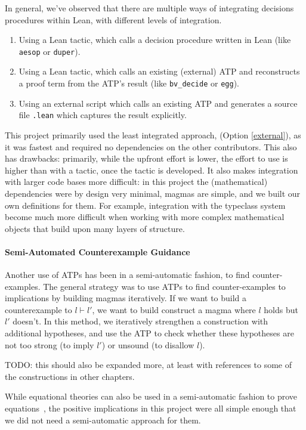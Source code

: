 In general, we've observed that there are multiple ways of integrating decisions procedures within Lean, with different levels of integration.
\begin{enumerate}
    \item Using a Lean tactic, which calls a decision procedure written in Lean (like \texttt{aesop} or \texttt{duper}).
    \item Using a Lean tactic, which calls an existing (external) ATP and reconstructs a proof term from the ATP's result (like \texttt{bv\_decide} or \texttt{egg}).
    \item\label{external} Using an external script which calls an existing ATP and generates a source file \texttt{.lean} which captures the result explicitly.
\end{enumerate}


This project primarily used the least integrated approach, (Option \ref{external}), as it was fastest and required no dependencies on the other contributors.
This also has drawbacks: primarily, while the upfront effort is lower, the effort to use is higher than with a tactic, once the tactic is developed.
It also makes integration with larger code bases more difficult: in this project the (mathematical) dependencies were by design very minimal, magmas are simple, and we built our own definitions for them.
For example, integration with the typeclass system become much more difficult when working with more complex mathematical objects that build upon many layers of structure.

\paragraph{Semi-Automated Counterexample Guidance}

Another use of ATPs has been in a semi-automatic fashion, to find counter-examples.
The general strategy was to use ATPs to find counter-examples to implications by building magmas iteratively.
If we want to build a counterexample to $l \vdash l'$, we want to build construct a magma where $l$ holds but $l'$ doesn't.
In this method, we iteratively strengthen a construction with additional hypotheses, and use the ATP to check whether these hypotheses are not too strong (to imply $l'$) or unsound (to disallow $l$).

TODO: this should also be expanded more, at least with references to some of the constructions in other chapters.

While equational theories can also be used in a semi-automatic fashion to prove equations~\cite{DBLP:journals/pacmpl/KoehlerGBGTS24}, the positive implications in this project were all simple enough that we did not need a semi-automatic approach for them.

